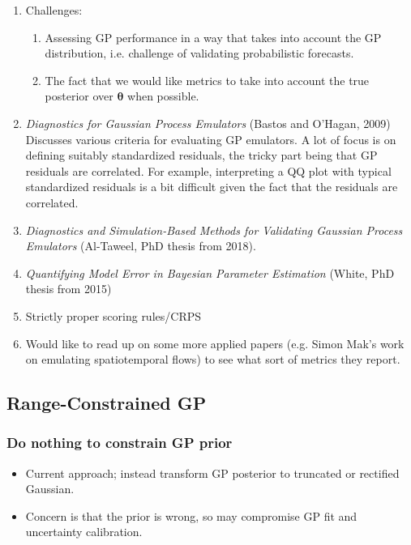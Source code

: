 \documentclass[12pt]{article}
\newcommand{\btheta}{\boldsymbol{\theta}}
\begin{document}
\begin{enumerate}
\item Challenges: 
	\begin{enumerate} 
	\item Assessing GP performance in a way that takes into account the GP distribution, i.e. challenge of validating probabilistic forecasts. 
	\item The fact that we would like metrics to take into account the true posterior over $\btheta$ when possible. 
	\end{enumerate}
\item \textit{Diagnostics for Gaussian Process Emulators} (Bastos and O'Hagan, 2009) \\
Discusses various criteria for evaluating GP emulators. A lot of focus is on defining suitably standardized residuals, the tricky part being that GP residuals are correlated. For example, interpreting 
a QQ plot with typical standardized residuals is a bit difficult given the fact that the residuals are correlated. 
\item \textit{Diagnostics and Simulation-Based Methods for Validating Gaussian Process Emulators} (Al-Taweel, PhD thesis from 2018). 
\item \textit{Quantifying Model Error in Bayesian Parameter Estimation} (White, PhD thesis from 2015)
\item Strictly proper scoring rules/CRPS
\item Would like to read up on some more applied papers (e.g. Simon Mak's work on emulating spatiotemporal flows) to see what sort of metrics they report. 
\end{enumerate}

\subsection{Range-Constrained GP}
\subsubsection{Do nothing to constrain GP prior}
\begin{itemize}
\item Current approach; instead transform GP posterior to truncated or rectified Gaussian. 
\item Concern is that the prior is wrong, so may compromise GP fit and uncertainty calibration. 
\end{itemize}
\end{document}
